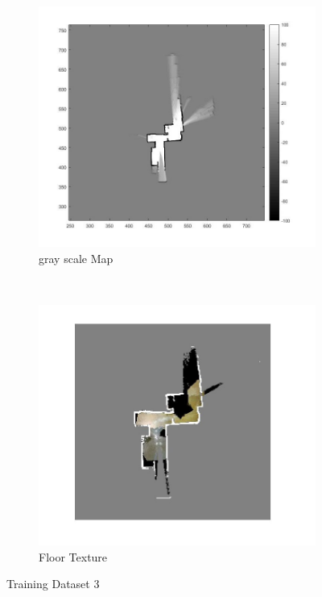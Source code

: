 \documentclass[fleqn,10pt]{SelfArx} %
\begin{document}
\begin{figure}
    \centering
    \begin{subfigure}[t]{0.5\textwidth}
        \centering
        \includegraphics[scale = 0.5]{set3_map.jpg}
        \caption{gray scale Map}
    \end{subfigure}%
    ~ 
    \begin{subfigure}[t]{0.5\textwidth}
        \centering
        \includegraphics[scale = 0.5]{set3_tm.jpg}
        \caption{Floor Texture}
    \end{subfigure}
    \caption{Training Dataset 3}
    \label{fig:train3}
\end{figure}
\end{document}
